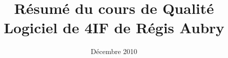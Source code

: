 \documentclass[a4paper]{report}
\title{Résumé du cours de Qualité Logiciel de 4IF de Régis Aubry}
\date{Décembre 2010}
\begin{document}
\maketitle

\vfill
\pagebreak

\tableofcontents

\vfill
\pagebreak

    
    
    
    
    
    
    
    
    
    
    

    \printglossaries
\end{document}
